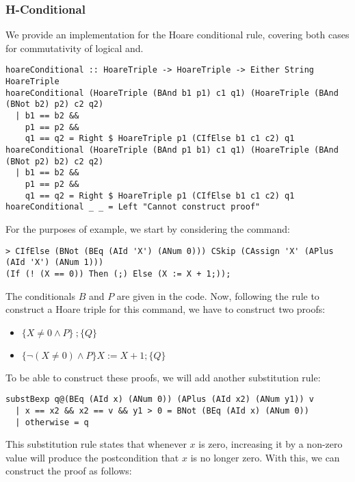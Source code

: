 \documentclass{article}
\begin{document}
\subsubsection{H-Conditional}

We provide an implementation for the Hoare conditional rule, covering both cases for commutativity of logical and.

\begin{lstlisting}
hoareConditional :: HoareTriple -> HoareTriple -> Either String HoareTriple
hoareConditional (HoareTriple (BAnd b1 p1) c1 q1) (HoareTriple (BAnd (BNot b2) p2) c2 q2)
  | b1 == b2 &&
    p1 == p2 &&
    q1 == q2 = Right $ HoareTriple p1 (CIfElse b1 c1 c2) q1
hoareConditional (HoareTriple (BAnd p1 b1) c1 q1) (HoareTriple (BAnd (BNot p2) b2) c2 q2)
  | b1 == b2 &&
    p1 == p2 &&
    q1 == q2 = Right $ HoareTriple p1 (CIfElse b1 c1 c2) q1
hoareConditional _ _ = Left "Cannot construct proof"
\end{lstlisting}

For the purposes of example, we start by considering the command:

\begin{lstlisting}
> CIfElse (BNot (BEq (AId 'X') (ANum 0))) CSkip (CAssign 'X' (APlus (AId 'X') (ANum 1)))
(If (! (X == 0)) Then (;) Else (X := X + 1;));
\end{lstlisting}

The conditionals $B$ and $P$ are given in the code. Now, following the rule to construct a Hoare triple for this command, we have to construct two proofs:

\begin{itemize}
\item $\{X \neq 0 \land P\} \ ; \{Q\}$
\item $\{\neg(X \neq 0) \land P\} X := X + 1; \{Q\}$
\end{itemize}

To be able to construct these proofs, we will add another substitution rule:

\begin{lstlisting}
substBexp q@(BEq (AId x) (ANum 0)) (APlus (AId x2) (ANum y1)) v
  | x == x2 && x2 == v && y1 > 0 = BNot (BEq (AId x) (ANum 0))
  | otherwise = q
\end{lstlisting}

This substitution rule states that whenever $x$ is zero, increasing it by a non-zero value will produce the postcondition that $x$ is no longer zero. With this, we can construct the proof as follows:
\end{document}
